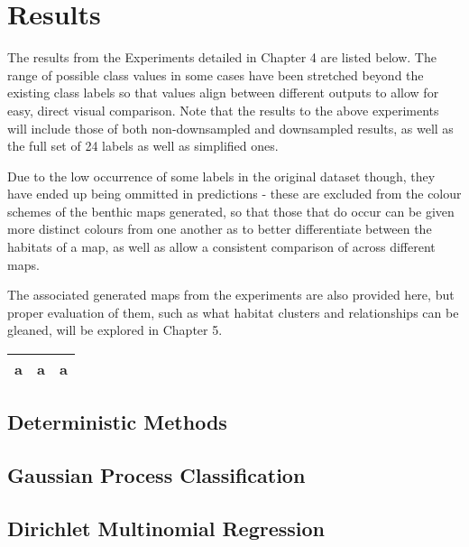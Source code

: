 \chapter{Results} \label{chap:results}

The results from the Experiments detailed in Chapter 4 are listed below. The range of possible class values in some cases have been stretched beyond the existing class labels so that values align between different outputs to allow for easy, direct visual comparison. Note that the results to the above experiments will include those of both non-downsampled and downsampled results, as well as the full set of 24 labels as well as simplified ones.

Due to the low occurrence of some labels in the original dataset though, they have ended up being ommitted in predictions - these are excluded from the colour schemes of the benthic maps generated, so that those that do occur can be given more distinct colours from one another as to better differentiate between the habitats of a map, as well as allow a consistent comparison of across different maps.

The associated generated maps from the experiments are also provided here, but proper evaluation of them, such as what habitat clusters and relationships can be gleaned, will be explored in Chapter 5. 

\begin{tabular}{|c|c|c|}
    \hline
    a & a & a \\
    \hline
\end{tabular}

\section{Deterministic Methods}

\section{Gaussian Process Classification}


\section{Dirichlet Multinomial Regression}



